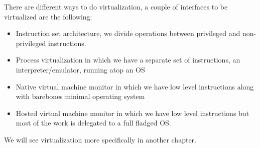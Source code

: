 There are different ways to do virtualization, a couple of interfaces to be virtualized are the following:
\begin{itemize}
    \item Instruction set architecture, we divide operations between privileged and non-privileged instructions.
    \item Process virtualization in which we have a separate set of instructions, an interpreter/emulator, running atop an OS
    \item Native virtual machine monitor in which we have low level instructions along with barebones minimal operating system
    \item Hosted virtual machine monitor in which we have low level instructions but most of the work is delegated to a full fladged OS.
\end{itemize}
We will see virtualization more specifically in another chapter.

